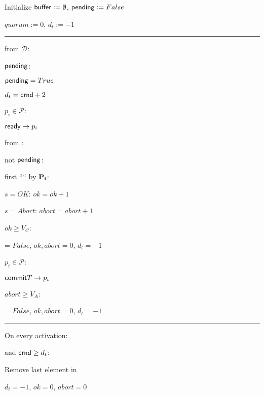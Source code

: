 \begin{bbox}[title={$\F_{\msf{3PC}} (\mathcal{D}, \mathcal{P} = p_1,...,p_n, V_C)$}]

Initialize ${\mathsf {buffer}} := \emptyset$, ${\mathsf {pending}} := False$ %

$quorum := 0$, $d_t := -1$

\vspace{2mm} \hrule \vspace{2mm}

\OnInput {} from $\mathcal{D}$:

	\quad \If ${\mathsf {pending}}$: \reject

	\quad ${\mathsf {pending}} = True$

	\quad $d_t = {\mathsf {crnd}} + 2$

	\quad \For $p_i \in \mathcal{P}$:

		\quad \quad {} \Send ${\mathsf {ready}} \rightarrow p_i$

%
%
%
%
%

\OnInput {} from \Partyi:

	\quad \If not ${\mathsf {pending}}$: \ignore

	\quad \If first ```` by ${\bf P_i}$:

		\quad \quad \If $s = OK$: $ok = ok + 1$

		\quad \quad \If $s = Abort$: $abort = abort + 1$

	\quad \If $ok \geq V_C$:

		\quad \quad {} = $False$, $ok,abort = 0$, $d_t = -1$

		\quad \quad \For $p_i \in \mathcal{P}$:
			
			\quad \quad \quad {} \Send ${\mathsf {commit}}{T} \rightarrow p_i$

	\quad \If $abort \geq V_A$:

		\quad \quad {} = $False$, $ok,abort = 0$, $d_t = -1$


%
%
%
%
%
%
%
%
%

\vspace{2mm} \hrule \vspace{2mm}

On every activation:

	\quad \If {} and ${\mathsf {crnd}} \geq d_t$:

		\quad \quad Remove last element in 

		\quad \quad $d_t = -1$, $ok = 0$, $abort = 0$

\end{bbox}
